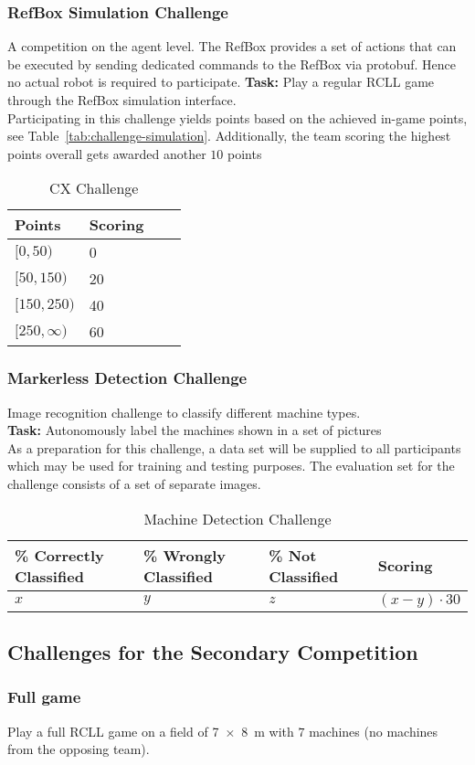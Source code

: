 \documentclass[12pt,twoside]{article}
\newcommand{\reftab}[1]{Table~\ref{#1}}
\begin{document}
\subsubsection{RefBox Simulation Challenge}\label{sec:challenge-simulation}
A competition on the agent level. The RefBox provides a set of actions
that can be executed by sending dedicated commands to the RefBox via protobuf.
Hence no actual robot is required to participate.
\textbf{Task:} Play a regular RCLL game through the RefBox simulation
interface.\\
Participating in this challenge yields points based on the achieved in-game
points, see \reftab{tab:challenge-simulation}.
Additionally, the team scoring the highest points overall gets awarded another
$10$ points
\begin{table}[!htb]
 \centering
 \begin{tabular}{l|l|l|l}
  Points & Scoring \\\hline
  $[0,50)$ & 0\\%
  $[50,150)$ & 20\\%
  $[150,250)$ & 40 \\%
  $[250,\infty)$ & 60 \\%
 \end{tabular}
 \caption{CX Challenge}
 \label{tab:challenge-cx}
\end{table}


\subsubsection{Markerless Detection Challenge}\label{sec:markerless}
Image recognition challenge to classify different machine types.\\
\textbf{Task:} Autonomously label the machines shown in a set of pictures\\
As a preparation for this challenge, a data set will be supplied to
all participants which may be used for training and testing purposes.
The evaluation set for the challenge consists of a set of separate images.
\begin{table}[!htb]
 \centering
 \begin{tabularx}{\linewidth}{l|l|l|l}
  \% Correctly Classified & \% Wrongly Classified & \% Not Classified
  & Scoring \\\hline
  $x$ & $y$ & $z$ & $(x-y)\cdot30$
 \end{tabularx}
 \caption{Machine Detection Challenge}
 \label{tab:challenge-markerless}
\end{table}

\subsection{Challenges for the Secondary Competition}

\subsubsection{Full game}\label{sec:challenge-full-game}
Play a full RCLL game on a field of \SI{7 x 8}{\metre} with $7$ machines
(no machines from the opposing team).
\end{document}
